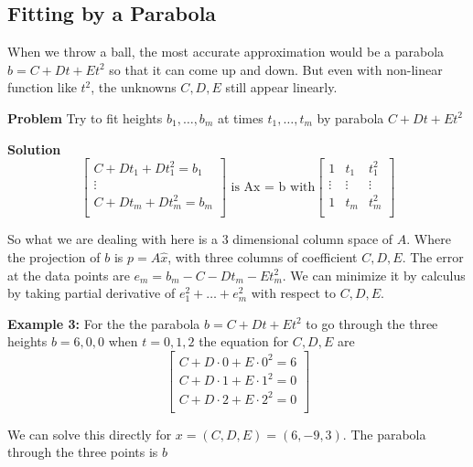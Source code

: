 \subsection{Fitting by a Parabola} 

When we throw a ball, the most accurate approximation would be  a parabola \(b = C + Dt + Et^2\) so that it can come up and down. But even with non-linear function like \(t^2\), the unknowns \(C, D, E\) still appear linearly. 

\textbf{Problem} Try to fit heights \(b_1, \ldots, b_m\) at times \(t_1, \ldots, t_m\) by parabola \(C + Dt + Et^2\)

\textbf{Solution} 
\[
    \begin{bmatrix}
         C + Dt_1 + Dt^2_1 = b_1 \\
         \vdots \\
         C + Dt_m + Dt^2_m = b_m \\
    \end{bmatrix}
    \text{ is Ax = b with}
    \begin{bmatrix}
        1 & t_1 & t^2_1  \\
        \vdots & \vdots & \vdots  \\
        1 & t_m & t^2_m   \\
    \end{bmatrix}
\]

So what we are dealing with here is a 3 dimensional column space of \(A\). Where the projection of \(b\) is \(p = A\hat{x}\), with three columns of coefficient \(C, D, E\). The error at the data points are \(e_m = b_m - C - Dt_m - Et^2_m\). We can minimize it by calculus by taking partial derivative of \(e^2_1 + \ldots + e^2_m\) with respect to \(C, D, E\). 

\textbf{Example 3:} For the the parabola \(b = C + Dt + Et^2\) to go through the three heights \(b = 6, 0, 0\) when \(t = 0, 1, 2\) the equation for \(C, D, E\) are 
\[
    \begin{bmatrix}
         C + D \cdot 0 + E \cdot 0^2 = 6\\
         C + D \cdot 1 + E \cdot 1^2 = 0 \\
         C + D \cdot 2 + E \cdot 2^2 = 0 \\
    \end{bmatrix}
\]     

We can solve this directly for \(x = (C, D, E) = (6, -9, 3)\). The parabola through the three points is \(b\)  

